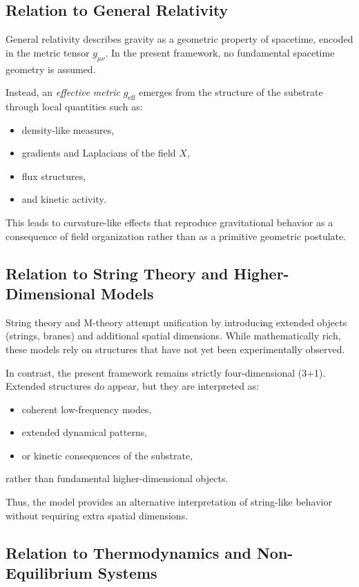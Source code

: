 \documentclass[11pt]{article}
\begin{document}
\subsection{Relation to General Relativity}

General relativity describes gravity as a geometric property of spacetime, encoded in the metric tensor $g_{\mu\nu}$. In the present framework, no fundamental spacetime geometry is assumed.

Instead, an \emph{effective metric} $g_{\mathrm{eff}}$ emerges from the structure of the substrate through local quantities such as:
\begin{itemize}
\item density-like measures,
\item gradients and Laplacians of the field $X$,
\item flux structures,
\item and kinetic activity.
\end{itemize}

This leads to curvature-like effects that reproduce gravitational behavior as a consequence of field organization rather than as a primitive geometric postulate.

\subsection{Relation to String Theory and Higher-Dimensional Models}

String theory and M-theory attempt unification by introducing extended objects (strings, branes) and additional spatial dimensions. While mathematically rich, these models rely on structures that have not yet been experimentally observed.

In contrast, the present framework remains strictly four-dimensional (3+1). Extended structures do appear, but they are interpreted as:
\begin{itemize}
\item coherent low-frequency modes,
\item extended dynamical patterns,
\item or kinetic consequences of the substrate,
\end{itemize}
rather than fundamental higher-dimensional objects.

Thus, the model provides an alternative interpretation of string-like behavior without requiring extra spatial dimensions.

\subsection{Relation to Thermodynamics and Non-Equilibrium Systems}
\end{document}
